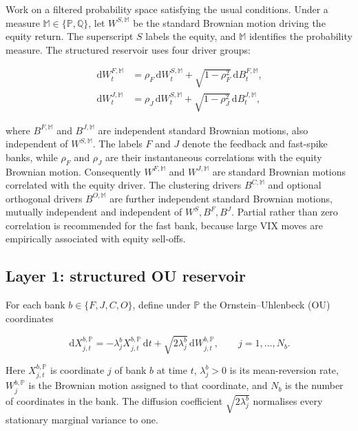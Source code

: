 \documentclass[11pt,a4paper]{article}
\newcommand{\Pp}{\mathbb{P}}
\newcommand{\Qq}{\mathbb{Q}}
\newcommand{\dd}{\,\mathrm{d}}
\begin{document}
Work on a filtered probability space satisfying the usual conditions. Under a measure
\(\mathbb M\in\{\Pp,\Qq\}\), let \(W^{S,\mathbb M}\) be the standard Brownian motion driving
the equity return. The superscript \(S\) labels the equity, and \(\mathbb M\) identifies the
probability measure. The structured reservoir uses four driver groups:

\begin{align}
\dd W_t^{F,\mathbb M}
  &=\rho_F\dd W_t^{S,\mathbb M}
    +\sqrt{1-\rho_F^2}\dd B_t^{F,\mathbb M}, \\
\dd W_t^{J,\mathbb M}
  &=\rho_J\dd W_t^{S,\mathbb M}
    +\sqrt{1-\rho_J^2}\dd B_t^{J,\mathbb M},
\end{align}

where \(B^{F,\mathbb M}\) and \(B^{J,\mathbb M}\) are independent standard Brownian motions,
also independent of \(W^{S,\mathbb M}\). The labels \(F\) and \(J\) denote the feedback and
fast-spike banks, while \(\rho_F\) and \(\rho_J\) are their instantaneous correlations with
the equity Brownian motion. Consequently \(W^{F,\mathbb M}\) and \(W^{J,\mathbb M}\) are
standard Brownian motions correlated with the equity driver. The clustering drivers
\(B^{C,\mathbb M}\) and optional orthogonal drivers \(B^{O,\mathbb M}\) are further independent
standard Brownian motions, mutually independent and independent of
\(W^S,B^F,B^J\). Partial rather than zero correlation is recommended for the fast bank,
because large VIX moves are empirically associated with equity sell-offs.

\subsection{Layer 1: structured OU reservoir}

For each bank \(b\in\{F,J,C,O\}\), define under \(\Pp\) the Ornstein--Uhlenbeck (OU)
coordinates

\begin{equation}
\dd X_{j,t}^{b,\Pp}
=-\lambda_j^b X_{j,t}^{b,\Pp}\dd t
+\sqrt{2\lambda_j^b}\dd W_{j,t}^{b,\Pp},
\qquad j=1,\ldots,N_b.
\label{eq:ou-bank}
\end{equation}

Here \(X_{j,t}^{b,\Pp}\) is coordinate \(j\) of bank \(b\) at time \(t\),
\(\lambda_j^b>0\) is its mean-reversion rate, \(W_{j}^{b,\Pp}\) is the Brownian motion assigned
to that coordinate, and \(N_b\) is the number of coordinates in the bank. The diffusion
coefficient \(\sqrt{2\lambda_j^b}\) normalises every stationary marginal variance to one.
\end{document}
